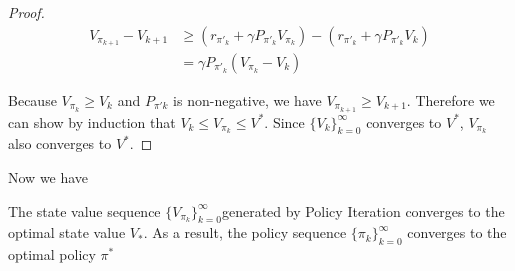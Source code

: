 \begin{proof}
	\begin{align*}
		V_{\pi_{k+1}}-V_{k+1} & \ge (r_{\pi'_{k}}+\gamma P_{\pi'_{k}}V_{\pi_{k}})-(r_{\pi'_{k}}+\gamma P_{\pi'_{k}}V_k) \\
		                      & = \gamma P_{\pi'_{k}}(V_{\pi_{k}}-V_{k})
	\end{align*}

	Because $V_{\pi_{k}}\ge V_{k}$ and $P_{\pi'{k}}$ is non-negative, we have $V_{\pi_{k+1}}\ge V_{k+1}$. Therefore we can show by induction that
	$V_{k}\le V_{\pi_{k}}\le V^*$. Since $\{V_{k}\}_{k=0}^{\infty}$ converges to $V^*$, $V_{\pi_{k}}$ also converges to $V^*$.
\end{proof}

Now we have
\begin{theorem}
	The state value sequence $\{V_{\pi_{k}}\}_{k=0}^{\infty}$generated by Policy Iteration converges to the optimal state value $V_{*}$. As a result, the policy sequence $\{\pi_{k}\}_{k=0}^{\infty}$ converges to the optimal policy $\pi^{*}$
\end{theorem}

